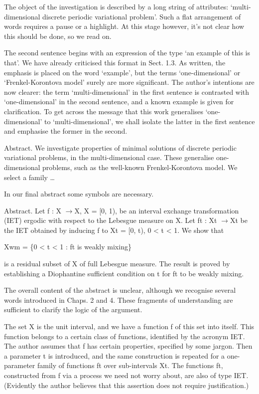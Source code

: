 \documentclass[11pt]{article}
\theoremstyle{plain}
\theoremstyle{definition}
\begin{document}
The object of the investigation is described by a long string of attributes: `multi-dimensional discrete periodic variational problem'. Such a flat arrangement of words requires a pause or a highlight. At this stage however, it's not clear how this should be done, so we read on.

The second sentence begins with an expression of the type `an example of this is that'. We have already criticised this format in Sect. 1.3. As written, the emphasis is placed on the word `example', but the terms `one-dimensional' or `Frenkel-Korontova model' surely are more significant. The author's intentions are now clearer: the term `multi-dimensional' in the first sentence is contrasted with `one-dimensional' in the second sentence, and a known example is given for clarification. To get across the message that this work generalises `one-dimensional' to `multi-dimensional', we shall isolate the latter in the first sentence and emphasise the former in the second.

Abstract. We investigate properties of minimal solutions of discrete periodic variational problems, in the multi-dimensional case. These generalise one-dimensional problems, such as the well-known Frenkel-Korontova model. We select a family \dots{}

In our final abstract some symbols are necessary.

Abstract. Let f : X $\to$X, X = [0, 1), be an interval exchange transformation (IET) ergodic with respect to the Lebesgue measure on X. Let ft : Xt $\to$Xt be the IET obtained by inducing f to Xt = [0, t), 0 < t < 1. We show that

Xwm = \{0 < t < 1 : ft is weakly mixing\}

is a residual subset of X of full Lebesgue measure. The result is proved by establishing a Diophantine sufficient condition on t for ft to be weakly mixing.

The overall content of the abstract is unclear, although we recognise several words introduced in Chaps. 2 and 4. These fragments of understanding are sufficient to clarify the logic of the argument.

The set X is the unit interval, and we have a function f of this set into itself. This function belongs to a certain class of functions, identified by the acronym IET. The author assumes that f has certain properties, specified by some jargon. Then a parameter t is introduced, and the same construction is repeated for a one-parameter family of functions ft over sub-intervals Xt. The functions ft, constructed from f via a process we need not worry about, are also of type IET. (Evidently the author believes that this assertion does not require justification.)
\end{document}
